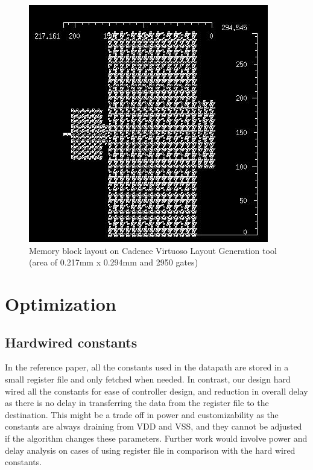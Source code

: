 \documentclass[letterpaper, 11pt]{article}
\begin{document}
	\begin{figure}[htb!]
		\centering
		\includegraphics[width=0.85\linewidth]{report_pics/mem_block_layout.png}
		\caption{Memory block layout on Cadence Virtuoso Layout Generation tool (area of 0.217mm x 0.294mm and 2950 gates)}
		\label{fig46}
	\end{figure}
	
	\newpage
	\section{Optimization}
	\label{sec:optimization}
	\subsection{Hardwired constants}
	\label{subsec:hardwire_constants}
	In the reference paper, all the constants used in the datapath are stored in a small register file and only fetched when needed. In contrast, our design hard wired all the constants for ease of controller design, and reduction in overall delay as there is no delay in transferring the data from the register file to the destination. This might be a trade off in power and customizability as the constants are always draining from VDD and VSS, and they cannot be adjusted if the algorithm changes these parameters. Further work would involve power and delay analysis on cases of using register file in comparison with the hard wired constants.
	
\end{document}
